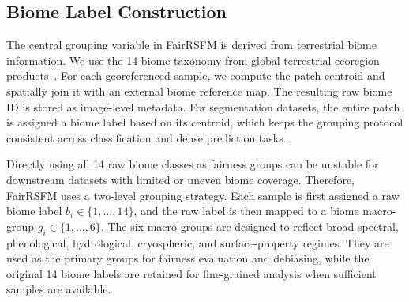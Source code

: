 \documentclass[10pt,twocolumn,letterpaper]{article}
\newcommand{\method}{FairRSFM\xspace}
\begin{document}
\subsection{Biome Label Construction}
The central grouping variable in \method is derived from terrestrial biome information. We use the 14-biome taxonomy from global terrestrial ecoregion products~\cite{terrestrialecoregions,ecoregions2017}. For each georeferenced sample, we compute the patch centroid and spatially join it with an external biome reference map. The resulting raw biome ID is stored as image-level metadata. For segmentation datasets, the entire patch is assigned a biome label based on its centroid, which keeps the grouping protocol consistent across classification and dense prediction tasks.

Directly using all 14 raw biome classes as fairness groups can be unstable for downstream datasets with limited or uneven biome coverage. Therefore, \method uses a two-level grouping strategy. Each sample is first assigned a raw biome label \(b_i\in\{1,\ldots,14\}\), and the raw label is then mapped to a biome macro-group \(g_i\in\{1,\ldots,6\}\). The six macro-groups are designed to reflect broad spectral, phenological, hydrological, cryospheric, and surface-property regimes. They are used as the primary groups for fairness evaluation and debiasing, while the original 14 biome labels are retained for fine-grained analysis when sufficient samples are available.
\end{document}
